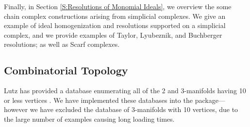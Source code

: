 \documentclass[12pt,leqno]{amsart}
\theoremstyle{definition}
\begin{document}
Finally, in Section \ref{S:Resolutions of Monomial Ideals}, we overview the
some chain complex constructions arising from simplicial complexes. We give an
example of ideal homogenization and resolutions supported on a simplicial
complex, and we provide examples of Taylor, Lyubeznik, and Buchberger
resolutions; as well as Scarf complexes.

\addtocounter{section}{1}
\subsection{Combinatorial Topology}
\label{S:Combinatorial Topology}

Lutz has provided a database enumerating all of the 2 and 3-manifolds having
10 or less vertices \cite{LutzM}. We have implemented these databases into the
package---however we have excluded the database of 3-manifolds with 10
vertices, due to the large number of examples causing long loading times.
\end{document}
